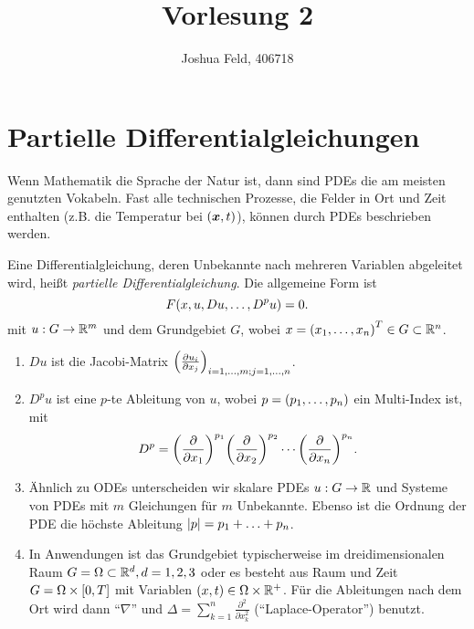 \documentclass{lecture}
\institute{Applied and Computational Mathematics}
\title{Vorlesung 2}
\author{Joshua Feld, 406718}
\begin{document}
    \maketitle


    \section*{Partielle Differentialgleichungen}

    Wenn Mathematik die Sprache der Natur ist, dann sind PDEs die am meisten genutzten Vokabeln.
    Fast alle technischen Prozesse, die Felder in Ort und Zeit enthalten (z.B. die Temperatur bei \(\parentheses*{\bm{x}, t}\)), können durch PDEs beschrieben werden.
    \begin{definition}
        Eine Differentialgleichung, deren Unbekannte nach mehreren Variablen abgeleitet wird, heißt \emph{partielle Differentialgleichung}.
        Die allgemeine Form ist
        \[
            F\parentheses*{x, u, Du, \ldots, D^p u} = 0.
        \]
        mit \(u: G \to \R^m\) und dem Grundgebiet \(G\), wobei \(x = \parentheses*{x_1, \ldots, x_n}^T \in G \subset \R^n\).
    \end{definition}
    \begin{remark}
        \begin{enumerate}
            \item \(Du\) ist die Jacobi-Matrix \(\parentheses*{\frac{\partial u_i}{\partial x_j}}_{i = 1, \ldots, m; j = 1, \ldots, n}\).
            \item \(D^p u\) ist eine \(p\)-te Ableitung von \(u\), wobei \(p = \parentheses*{p_1, \ldots, p_n}\) ein Multi-Index ist, mit
            \[
                D^p = \parentheses*{\frac{\partial}{\partial x_1}}^{p_1}\parentheses*{\frac{\partial}{\partial x_2}}^{p_2}\cdots\parentheses*{\frac{\partial}{\partial x_n}}^{p_n}.
            \]
            \item Ähnlich zu ODEs unterscheiden wir skalare PDEs \(u: G \to \R\) und Systeme von PDEs mit \(m\) Gleichungen für \(m\) Unbekannte.
            Ebenso ist die Ordnung der PDE die höchste Ableitung \(\absolute*{p} = p_1 + \ldots + p_n\).
            \item In Anwendungen ist das Grundgebiet typischerweise im dreidimensionalen Raum \(G = \Omega \subset \R^d, d = 1, 2, 3\) oder es besteht aus Raum und Zeit \(G = \Omega \times \brackets*{0, T}\) mit Variablen \(\parentheses*{x, t} \in \Omega \times \R^+\).
            Für die Ableitungen nach dem Ort wird dann ``\(\nabla\)'' und \(\Delta = \sum_{k = 1}^n \frac{\partial^2}{\partial x_k^2}\) (``Laplace-Operator'') benutzt.
        \end{enumerate}
    \end{remark}
\end{document}
